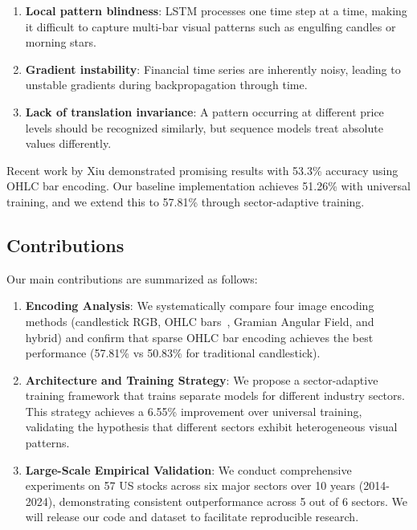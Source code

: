 \documentclass[runningheads]{llncs}
\begin{document}
\begin{enumerate}
    \item \textbf{Local pattern blindness}: LSTM processes one time step at a time, making it difficult to capture multi-bar visual patterns such as engulfing candles or morning stars.
    \item \textbf{Gradient instability}: Financial time series are inherently noisy, leading to unstable gradients during backpropagation through time.
    \item \textbf{Lack of translation invariance}: A pattern occurring at different price levels should be recognized similarly, but sequence models treat absolute values differently.
\end{enumerate}

Recent work by Xiu \etal \cite{Xiu21} demonstrated promising results with 53.3\% accuracy using OHLC bar encoding. Our baseline implementation achieves 51.26\% with universal training, and we extend this to 57.81\% through sector-adaptive training.

\subsection{Contributions}
\label{sec:contributions}

Our main contributions are summarized as follows:

\begin{enumerate}
    \item \textbf{Encoding Analysis}: We systematically compare four image encoding methods (candlestick RGB, OHLC bars~\cite{Xiu21}, Gramian Angular Field, and hybrid) and confirm that sparse OHLC bar encoding achieves the best performance (57.81\% vs 50.83\% for traditional candlestick).
    
    \item \textbf{Architecture and Training Strategy}: We propose a sector-adaptive training framework that trains separate models for different industry sectors. This strategy achieves a 6.55\% improvement over universal training, validating the hypothesis that different sectors exhibit heterogeneous visual patterns.
    
    \item \textbf{Large-Scale Empirical Validation}: We conduct comprehensive experiments on 57 US stocks across six major sectors over 10 years (2014-2024), demonstrating consistent outperformance across 5 out of 6 sectors. We will release our code and dataset to facilitate reproducible research.
\end{enumerate}
\end{document}
